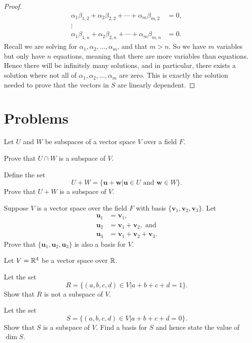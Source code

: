\begin{proof}
\begin{align*}
        \alpha_1\beta_{1,2} + \alpha_2\beta_{2,2} + \cdots + \alpha_m\beta_{m,2} &= 0,\\
        \vdots\\
        \alpha_1\beta_{1,n} + \alpha_2\beta_{2,n} + \cdots + \alpha_m\beta_{m,n} &= 0.
    \end{align*}
    Recall we are solving for $\alpha_1, \alpha_2, \dots, \alpha_m$, and that $m > n$. So we have $m$ variables but only have $n$ equations, meaning that there are more variables than equations. Hence there will be infinitely many solutions, and in particular, there exists a solution where not all of $\alpha_1, \alpha_2, \dots, \alpha_m$ are zero. This is exactly the solution needed to prove that the vectors in $S$ are linearly dependent.
\end{proof}

\newpage

\section{Problems}
\begin{problem}
    Let $U$ and $W$ be subspaces of a vector space $V$ over a field $F$.
    \begin{partquestions}{\alph*}
        \item Prove that $U \cap W$ is a subspace of $V$.
        \item Define the set
        \[
            U + W = \{\textbf{u} + \textbf{w} \vert \textbf{u} \in U \text{ and } \textbf{w} \in W\}.
        \]
        Prove that $U + W$ is a subspace of $V$.
    \end{partquestions}
\end{problem}

\begin{problem}
    Suppose $V$ is a vector space over the field $F$ with basis $\{\textbf{v}_1, \textbf{v}_2, \textbf{v}_3\}$. Let
    \begin{align*}
        \textbf{u}_1 &= \textbf{v}_1,\\
        \textbf{u}_2 &= \textbf{v}_1 + \textbf{v}_2, \text{ and}\\
        \textbf{u}_3 &= \textbf{v}_1 + \textbf{v}_2 + \textbf{v}_3.
    \end{align*}
    Prove that $\{\textbf{u}_1, \textbf{u}_2, \textbf{u}_3\}$ is also a basis for $V$.
\end{problem}

\begin{problem}
    Let $V = \mathbb{R}^4$ be a vector space over $\mathbb{R}$.
    \begin{partquestions}{\alph*}
        \item Let the set
        \[
            R = \{(a, b, c, d) \in V \vert a + b + c + d = 1\}.
        \]
        Show that $R$ is not a subspace of $V$.

        \item Let the set
        \[
            S = \{(a, b, c, d) \in V \vert a + b + c + d = 0\}.
        \]
        Show that $S$ is a subspace of $V$. Find a basis for $S$ and hence state the value of $\dim{S}$.
    \end{partquestions}
\end{problem}

